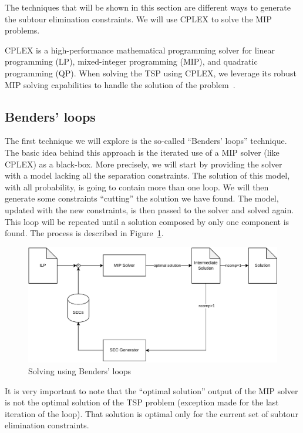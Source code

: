 \documentclass{article}
\begin{document}
The techniques that will be shown in this section are different ways to generate
the subtour elimination constraints. We will use CPLEX to solve the MIP
problems.

CPLEX is a high-performance mathematical programming solver for linear
programming (LP), mixed-integer programming (MIP), and quadratic programming
(QP). When solving the TSP using CPLEX, we leverage its robust MIP solving
capabilities to handle the solution of the problem~\cite{cplex-docs}.
\subsection{Benders' loops}
\label{ssec:benders}
The first technique we will explore is the so-called ``Benders' loops'' technique.
The basic idea behind this approach is the iterated use of a MIP solver (like CPLEX)
as a black-box. More precisely, we will start by providing the solver with
a model lacking all the separation constraints. The solution of this model,
with all probability, is going to contain more than one loop. We will then
generate some constraints ``cutting'' the solution we have found.
The model, updated with the new constraints, is then passed to the solver
and solved again. This loop will be repeated until a solution composed by
only one component is found.
The process is described in Figure~\ref{fig:benders}.

\begin{figure}[ht]
        \caption{Solving using Benders' loops}
        \label{fig:benders}
        \centering
        \includegraphics[width=340pt]{assets/bendersloops.drawio.pdf}
\end{figure}

It is very important to note that the ``optimal solution'' output of the
MIP solver is not the optimal solution of the TSP problem (exception made
for the last iteration of the loop). That solution is optimal only for the
current set of subtour elimination constraints.
\end{document}
